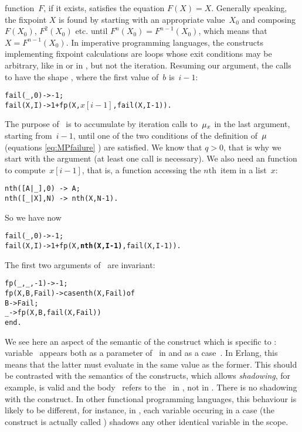 function~\(F\), if it exists, satisfies the equation \({F(X) =
  X}\). Generally speaking, the fixpoint \(X\) is found by starting
with an appropriate value~\(X_0\) and composing \(F(X_0)\),
\(F^2(X_0)\) etc. until \(F^n(X_0) = F^{n-1}(X_0)\), which means that
\(X = F^{n-1}(X_0)\). In imperative programming languages, the
constructs implementing fixpoint calculations are loops whose exit
conditions may be arbitrary, like  in \C or
 in \Pascal, but not the 
iteration. Resuming our argument, the calls to  have the
shape , where the
first value of~\(b\) is~\({i-1}\):
\begin{alltt}
fail(_,0) -> -1;
fail(X,I) -> 1 + fp(X,\(x[i-1]\),fail(X,I-1)).
\end{alltt}
The purpose of~ is to accumulate by iteration calls
to~\(\mu_{x}\) in the last argument, starting
from~\({i-1}\), until one of the two conditions of the definition
of~\(\mu\) (equations \eqref{eq:MPfailure}
) are satisfied. We know that \(q > 0\), that
is why we start with the argument  (at least one
call is necessary). We also need an \Erlang function to
compute~\(x[i-1]\), that is, a function accessing the \(n\)th~item in
a list~\(x\):
\begin{verbatim}
nth([A|_],0) -> A;
nth([_|X],N) -> nth(X,N-1).
\end{verbatim}
So we have now 
\begin{alltt}
fail(_,0) -> -1;\hfill% \(\MPfailure{x}{}{0} = -1\)
fail(X,I) -> 1 + fp(X,\textbf{nth(X,I-1)},fail(X,I-1)).\hfill% \(1+\MPfailure{x}{q}{i-1}\)
\end{alltt}
The first two arguments of~ are invariant:
\begin{alltt}
fp(_,_,  -1) -> -1;\hfill% \(1 + \MPfailure{x}{q}{i} = 0\)
fp(X,B,Fail) -> case nth(X,Fail) of\hfill% \(1 + \MPfailure{x}{q}{i} \neq 0\)
                  B -> Fail;\hfill% \(x[\MPfailure{x}{q}{i}] = x[i]\)
                  _ -> fp(X,B,fail(X,Fail))\hfill% \emph{Try} \(\MPfailure{x}{}{\MPfailure{x}{q}{i}}\)
                end.
\end{alltt}
We see here an aspect of the semantic of the  construct
which is specific to \Erlang: variable~ appears both as a
parameter of~ in  and as a
case~. In Erlang, this means that the latter must evaluate
in the same value as the former. This should be contrasted with the
semantics of the  constructs, which allows
\emph{shadowing}, for example,  is valid and the body~ refers to the~ in
, not in . There is no shadowing
with the  construct. In other functional programming
languages, this behaviour is likely to be different, for instance, in
\OCaml, each variable occuring in a case (the construct is actually
called ) shadows any other identical variable in the
scope.

